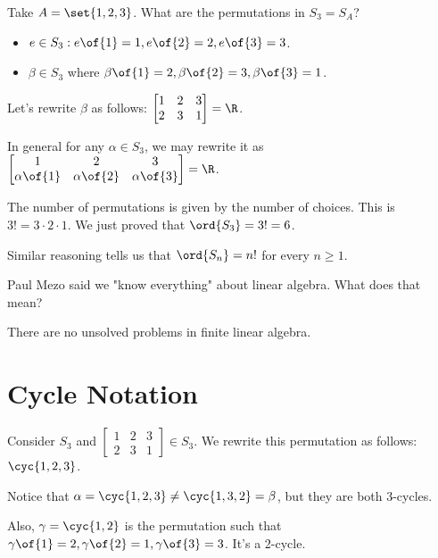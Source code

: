 \begin{example}
    Take $A = \set{1,2,3}$.
    What are the permutations in $S_3 = S_A$?
    \begin{itemize}
        \item $e \in S_3: e\of{1} = 1, e\of{2} = 2, e\of{3} = 3$.
        \item $\beta \in S_3$ where $\beta\of{1} = 2, \beta\of{2} = 3, \beta\of{3} = 1$.
    \end{itemize}
    Let's rewrite $\beta$ as follows: $\begin{bmatrix} 1 & 2 & 3 \\ 2 & 3 & 1 \end{bmatrix} = \R$.

    In general for any $\alpha \in S_3$, we may rewrite it as $\begin{bmatrix} 1 & 2 & 3 \\ \alpha\of{1} & \alpha\of{2} & \alpha\of{3} \end{bmatrix} = \R$.

    The number of permutations is given by the number of choices. This is $3! = 3 \cdot 2 \cdot 1$. We just proved that $\ord{S_3} = 3! = 6$.
    
    Similar reasoning tells us that $\ord{S_n} = n!$ for every $n \geq 1$.
\end{example}

\begin{question}
    Paul Mezo said we "know everything" about linear algebra. What does that mean?
\end{question}
\begin{answer}
    There are no unsolved problems in finite linear algebra.
\end{answer}

\section{Cycle Notation}

Consider $S_3$ and $\begin{bmatrix} 1 & 2 & 3 \\ 2 & 3 & 1 \end{bmatrix} \in S_3$. We rewrite this permutation as follows: $\cyc{1,2,3}$.

Notice that $\alpha = \cyc{1,2,3} \neq \cyc{1,3,2} = \beta$, but they are both 3-cycles.

Also, $\gamma = \cyc{1,2}$ is the permutation such that $\gamma\of{1} = 2, \gamma\of{2} = 1, \gamma\of{3} = 3$. It's a 2-cycle.

